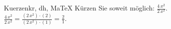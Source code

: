 \begin{MAufgabe}{Kuerzen}{kr, dh, MaTeX}
K\"urzen Sie soweit m\"oglich: $\frac{4\, x^2}{2\, x^2}$.\\ 
\ifLsg\MLoesung
\quad $\frac{4\, x^2}{2\, x^2}=\frac{(2\, x^2)\cdot(2)}{(2\, x^2)\cdot(1)}=\frac{2}{1}$.\else\relax\fi
 \end{MAufgabe}